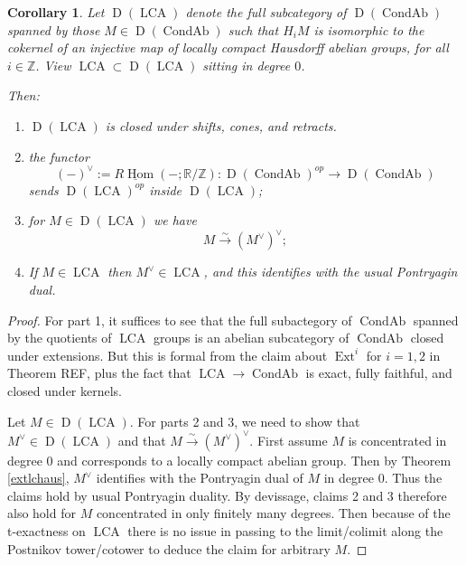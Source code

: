\documentclass[12pt]{article}
\newtheorem{corollary}[theorem]{Corollary}
\theoremstyle{definition}
\newcommand{\on}{\operatorname}
\newcommand{\mbb}{\mathbb}
\newcommand{\ul}{\underline}
\begin{document}
\begin{corollary}\label{dpd}
Let $\on{D}(\on{LCA})$ denote the full subcategory of $\on{D}(\on{CondAb})$ spanned by those $M\in \on{D}(\on{CondAb})$ such that $H_iM$ is isomorphic to the cokernel of an injective map of locally compact Hausdorff abelian groups, for all $i\in \mbb{Z}$.  View $\on{LCA}\subset \on{D}(\on{LCA})$ sitting in degree $0$.

Then:
\begin{enumerate}
\item $\on{D}(\on{LCA})$ is closed under shifts, cones, and retracts.
\item the functor
$$(-)^\vee:=\ul{R\on{Hom}}(-;\mbb{R}/\mbb{Z}): \on{D}(\on{CondAb})^{op}\to \on{D}(\on{CondAb})$$
sends $\on{D}(\on{LCA})^{op}$ inside $\on{D}(\on{LCA})$;
\item for $M\in \on{D}(\on{LCA})$ we have
$$M \overset{\sim}{\rightarrow} (M^\vee)^\vee;$$
\item If $M\in\on{LCA}$ then $M^\vee\in\on{LCA}$, and this identifies with the usual Pontryagin dual.
\end{enumerate}
\end{corollary}
\begin{proof}
For part 1, it suffices to see that the full subactegory of $\on{CondAb}$ spanned by the quotients of $\on{LCA}$ groups is an abelian subcategory of $\on{CondAb}$ closed under extensions.  But this is formal from the claim about $\on{Ext}^i$ for $i=1,2$ in Theorem REF, plus the fact that $\on{LCA}\to \on{CondAb}$ is exact, fully faithful, and closed under kernels.

Let $M\in \on{D}(\on{LCA})$. For parts 2 and 3, we need to show that $M^\vee\in \on{D}(\on{LCA})$ and that $M\overset{\sim}{\rightarrow} (M^\vee)^\vee$. First assume $M$ is concentrated in degree $0$ and corresponds to a locally compact abelian group.  Then by Theorem \ref{extlchaus}, $M^\vee$ identifies with the Pontryagin dual of $M$ in degree $0$.  Thus the claims hold by usual Pontryagin duality.  By devissage, claims 2 and 3 therefore also hold for $M$ concentrated in only finitely  many degrees.  Then because of the t-exactness on $\on{LCA}$ there is no issue in passing to the limit/colimit along the Postnikov tower/cotower to deduce the claim for arbitrary $M$.
\end{proof}
\end{document}
